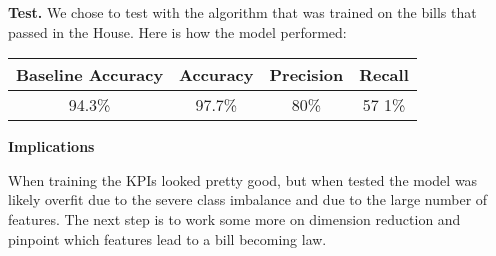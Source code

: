 \documentclass[12pt]%
{article}
\begin{document}
\textbf{Test.}  We chose to test with the algorithm that was trained on the bills that passed in the House.  Here is how the model performed:

\begin{center}
\renewcommand{\arraystretch}{1.5}
\begin{tabular}{| c | c | c | c |}
\hline
\textbf{Baseline Accuracy} & \textbf{Accuracy} & \textbf{Precision} & \textbf{Recall} \\
\hline
94.3\% & 97.7\% & 80\% & 57
1\% \\
\hline
\end{tabular}
\end{center}

\vspace{0.5pc}
\begin{center}
{\large\textbf{Implications}}
\end{center}

When training the KPIs looked pretty good, but when tested the model was likely overfit due to the severe class imbalance and due to the large number of features.  The next step is to work some more on dimension reduction and pinpoint which features lead to a bill becoming law.
\end{document}
